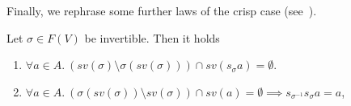 \documentclass{llncs}
\def\monop{\otimes}
\begin{document}

Finally, we rephrase some further laws of the crisp case 
(see~\cite[p.140]{pippo}).

\begin{lemma}
	\label{lemmaSubs}
	Let $\sigma \in F(V)$ be invertible. Then it holds
	\begin{enumerate}
		\item $\forall a\in A.\ (sv(\sigma) \setminus  \sigma(sv(\sigma))) \cap sv(s_\sigma a) = \emptyset$.
		\item $\forall a\in A.\ (\sigma(sv(\sigma)) \setminus sv(\sigma)) \cap sv(a) = \emptyset \implies s_{\sigma^{-1}} s_{\sigma} a = a$,
	\end{enumerate}
\end{lemma}
\end{document}
